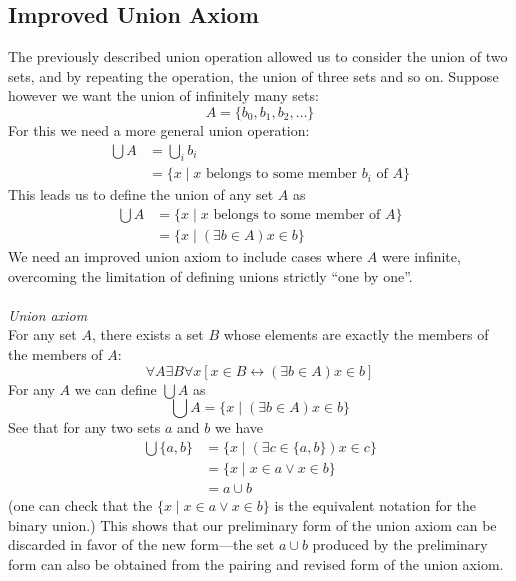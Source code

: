 \documentclass{report}
\begin{document}
\subsection{Improved Union Axiom}
The previously described union operation allowed us to consider the union of two sets, and by repeating the operation, the union of three sets and so on.
Suppose however we want the union of infinitely many sets:
\begin{equation*}
A=\{b_0,b_1,b_2,\ldots\}
\end{equation*}
For this we need a more general union operation:
\begin{align*}
\bigcup A&=\bigcup_ib_i\\
&=\{x\mid x\text{ belongs to some member $b_i$ of $A$}\}
\end{align*}
This leads us to define the union of any set $A$ as
\begin{align*}
\bigcup A&=\{x\mid x\text{ belongs to some member of $A$}\}\\
&=\{x\mid(\exists b\in A)x\in b\}
\end{align*}
We need an improved union axiom to include cases where $A$ were infinite, overcoming the limitation of defining unions strictly ``one by one''.\\
\vspace{1mm}\\
\textit{Union axiom}\\
For any set $A$, there exists a set $B$ whose elements are exactly the members of the members of $A$:
\begin{equation*}
\forall A\exists B\forall x[x\in B\leftrightarrow(\exists b\in A) x\in b]
\end{equation*}
For any $A$ we can define $\bigcup A$ as
\begin{equation*}
\bigcup A=\{x\mid(\exists b\in A)x\in b\}
\end{equation*}
See that for any two sets $a$ and $b$ we have
\begin{align*}
\bigcup\{a,b\}&=\{x\mid(\exists c\in\{a,b\})x\in c\}\\
&=\{x\mid x\in a\lor x\in b\}\\
&=a\cup b
\end{align*}
(one can check that the $\{x\mid x\in a\lor x\in b\}$ is the equivalent notation for the binary union.) This shows that our preliminary form of the union axiom can be discarded in favor of the new
form---the set $a\cup b$ produced by the preliminary form can also be obtained from the pairing and revised form of the union axiom.
\newpage
\end{document}
